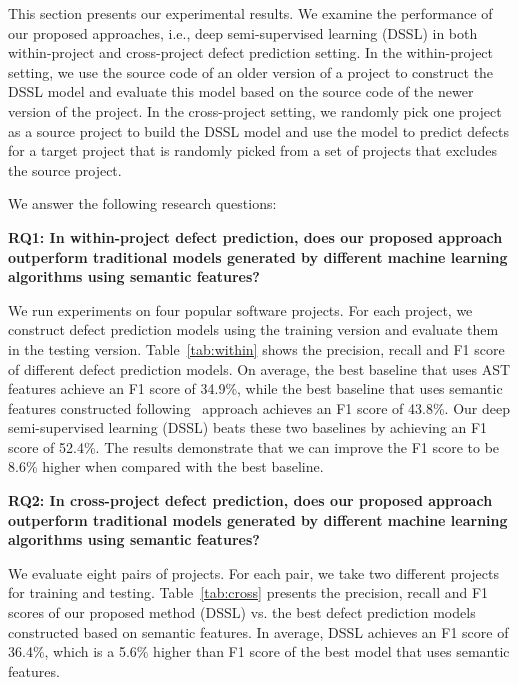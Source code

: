 This section presents our experimental results. We examine the performance of our proposed approaches, i.e., deep semi-supervised learning (DSSL) in both within-project and cross-project defect prediction setting. In the within-project setting, we use the source code of an older version of a project to construct the DSSL model and evaluate this model based on the source code of the newer version of the project. In the cross-project setting, we randomly pick one project as a source project to build the DSSL model and use the model to predict defects for a target project that is randomly picked from a set of projects that excludes the source project.

We answer the following research questions: 

\textbf{RQ1: In within-project defect prediction, does our proposed approach outperform traditional models generated by different machine learning algorithms using semantic features?}

We run experiments on four popular software projects. For each project, we construct defect prediction models using the training version and evaluate them in the testing version. 
Table~\ref{tab:within} shows the precision, recall and F1 score of different defect prediction models. On average, the best baseline that uses AST features achieve an F1 score of 34.9\%, while the best baseline that uses semantic features constructed following~\cite{wang2016automatically} approach achieves an F1 score of 43.8\%. Our deep semi-supervised learning (DSSL) beats these two baselines by achieving an F1 score of 52.4\%. The results demonstrate that we can improve the F1 score to be 8.6\% higher when compared with the best baseline. 


\textbf{RQ2: In cross-project defect prediction, does our proposed approach outperform traditional models generated by different machine learning algorithms using semantic features?}

We evaluate eight pairs of projects. For each pair, we take two different projects for training and testing. Table~\ref{tab:cross} presents the precision, recall and F1 scores of our proposed method (DSSL) vs. the best defect prediction models constructed based on semantic features. In average, DSSL achieves an F1 score of 36.4\%, which is a 5.6\% higher than F1 score of the best model that uses semantic features. 

